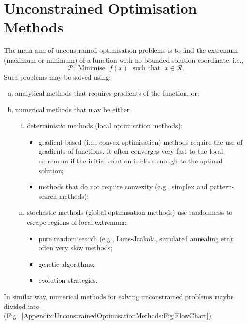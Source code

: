 
\chapter{Unconstrained Optimisation Methods}\label{Appendix:UnconstrainedOptimisationMethods}

The main aim of unconstrained optimisation problems is to find the extremum (maximum or minimum) of a function with no bounded solution-coordinate, i.e., \citep[see][]{Conn_Book}
\begin{displaymath}
   \mathcal{P}: \text{ Minimise }\; f(x)\; \text{ such that }\; x\in\mathcal{R}. 
\end{displaymath}
Such problems may be solved using:
   \begin{enumerate}[a)]
      \item analytical methods that requires gradients of the function, or;
      \item numerical methods that may be either 
          \begin{enumerate}[i)]
              \item deterministic methods (local optimisation methods):
                  \begin{itemize}
                     \item gradient-based (i.e., convex optimisation) methods require the use of gradients of functions. It often converges very fast to the local extremum if the initial solution is close enough to the optimal solution;
                     \item methods that do not require convexity (e.g., simplex and pattern-search methods); 
                  \end{itemize} 
              \item stochastic methods (global optimisation methods) use randomness to escape regions of local extremum:
                  \begin{itemize}
                     \item pure random search (e.g., Luus-Jaakola, simulated annealing etc): often very slow methods;
                     \item genetic algorithms;
                     \item evolution strategies.
                  \end{itemize}
          \end{enumerate} 
   \end{enumerate}
In similar way, numerical methods for solving unconstrained problems maybe divided into (Fig.~\ref{Appendix:UnconstrainedOptimisationMethods:Fig:FlowChart})
